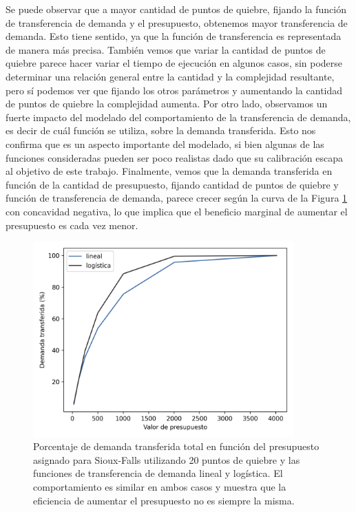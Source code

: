 Se puede observar que a mayor cantidad de puntos de quiebre, fijando la función de transferencia de demanda y el presupuesto, obtenemos mayor transferencia de demanda. Esto tiene sentido, ya que la función de transferencia es representada de manera más precisa. También vemos que variar la cantidad de puntos de quiebre parece hacer variar el tiempo de ejecución en algunos casos, sin poderse determinar una relación general entre la cantidad y la complejidad resultante, pero sí podemos ver que fijando los otros parámetros y aumentando la cantidad de puntos de quiebre la complejidad aumenta. Por otro lado, observamos un fuerte impacto del modelado del comportamiento de la transferencia de demanda, es decir de cuál función se utiliza, sobre la demanda transferida. Esto nos confirma que es un aspecto importante del modelado, si bien algunas de las funciones consideradas pueden ser poco realistas dado que su calibración escapa al objetivo de este trabajo. Finalmente, vemos que la demanda transferida en función de la cantidad de presupuesto, fijando cantidad de puntos de quiebre y función de transferencia de demanda, parece crecer según la curva de la Figura \ref{fig:demandtransferbybudgetlinear} con concavidad negativa, lo que implica que el beneficio marginal de aumentar el presupuesto es cada vez menor.

\begin{figure}[h!]
  \centering
  \includegraphics[width=10cm]{../resources/demand_by_budget.png}
    \caption{Porcentaje de demanda transferida total en función del presupuesto asignado para Sioux-Falls utilizando 20 puntos de quiebre y las funciones de transferencia de demanda lineal y logística. El comportamiento es similar en ambos casos y muestra que la eficiencia de aumentar el presupuesto no es siempre la misma.}
  \label{fig:demandtransferbybudgetlinear}
\end{figure}

